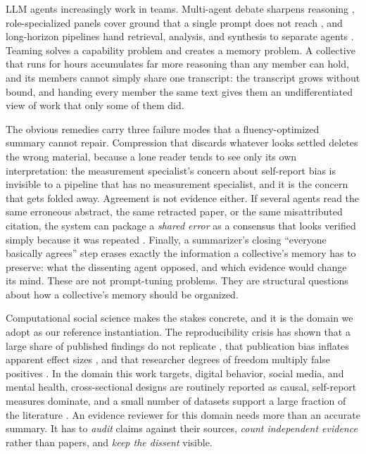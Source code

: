 LLM agents increasingly work in teams. Multi-agent debate sharpens reasoning
\citep{du2023improving,liang2023encouraging}, role-specialized panels cover
ground that a single prompt does not reach \citep{chen2023agentverse}, and
long-horizon pipelines hand retrieval, analysis, and synthesis to separate
agents \citep{qian2024chatdev}. Teaming solves a capability problem and creates
a memory problem. A collective that runs for hours accumulates far more
reasoning than any member can hold, and its members cannot simply share one
transcript: the transcript grows without bound, and handing every member the
same text gives them an undifferentiated view of work that only some of them
did.

The obvious remedies carry three failure modes that a fluency-optimized summary
cannot repair. Compression that discards whatever looks settled deletes the
wrong material, because a lone reader tends to see only its own
interpretation: the measurement specialist's concern about self-report bias is
invisible to a pipeline that has no measurement specialist, and it is the
concern that gets folded away. Agreement is not evidence either. If several
agents read the same erroneous abstract, the same retracted paper, or the same
misattributed citation, the system can package a \emph{shared error} as a
consensus that looks verified simply because it was repeated
\citep{ioannidis2005why,osc2015estimating}. Finally, a summarizer's closing
``everyone basically agrees'' step erases exactly the information a
collective's memory has to preserve: what the dissenting agent opposed, and
which evidence would change its mind. These are not prompt-tuning problems.
They are structural questions about how a collective's memory should be
organized.

Computational social science makes the stakes concrete, and it is the domain we
adopt as our reference instantiation. The reproducibility crisis has shown that
a large share of published findings do not replicate
\citep{osc2015estimating}, that publication bias inflates apparent effect
sizes \citep{fanelli2010positive}, and that researcher degrees of freedom
multiply false positives \citep{gelman2013garden,nosek2018preregistration}.
In the domain this work targets, digital behavior, social media, and mental
health, cross-sectional designs are routinely reported as causal, self-report
measures dominate, and a small number of datasets support a large fraction of
the literature \citep{orben2019association,valkenburg2022social}. An evidence
reviewer for this domain needs more than an accurate summary. It has to
\emph{audit} claims against their sources, \emph{count independent evidence}
rather than papers, and \emph{keep the dissent} visible.

